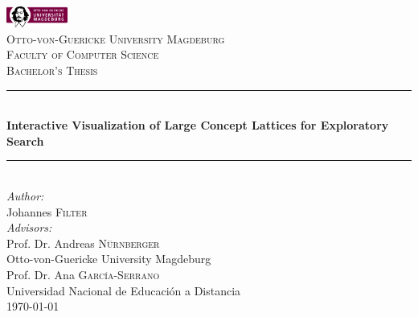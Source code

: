 \begin{titlepage}

\newcommand{\HRule}{\rule{\linewidth}{0.5mm}} %

\center %
 
\includegraphics[width=0.15\textwidth]{./logo}\\[1cm]

\textsc{\LARGE Otto-von-Guericke University Magdeburg}\\[0.5cm] %
\textsc{\large Faculty of Computer Science}\\[1.0cm] %
\textsc{\Large Bachelor's Thesis}\\[1.0cm] %


\HRule \\[0.5cm]
{ \huge \bfseries Interactive Visualization of Large Concept Lattices for Exploratory Search}\\[0.5cm] %
\HRule \\[1.0cm]
 

\Large \emph{Author:}\\
Johannes \textsc{Filter}\\[0.5cm]

\Large \emph{Advisors:}\\
Prof. Dr. Andreas \textsc{Nürnberger}\\
{\small Otto-von-Guericke University Magdeburg}\\[0.5cm]

Prof. Dr. Ana \textsc{García-Serrano}\\
{\small Universidad Nacional de Educación a Distancia}\\[1.0cm]


{\large \today}

\vfill %

\end{titlepage}